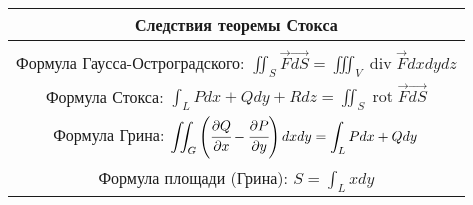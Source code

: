 \begin{tabular}{|cccc|}
	\multicolumn{4}{c}{Следствия теоремы Стокса} \\
	\hline
	& & & \\[0.1ex]

\multicolumn{4}{|c|}{Формула Гаусса-Остроградского: $\displaystyle\iint_S \vec{F}\vec{dS} = \iiint_V \operatorname{div}\vec{F}dxdydz$} \\[0.5cm]


\multicolumn{4}{|c|}{Формула Стокса: $\displaystyle \int_L Pdx + Qdy + Rdz = \iint_S \operatorname{rot}\vec{F} \vec{dS}$} \\[0.5cm]

\multicolumn{4}{|c|}{Формула Грина: $\displaystyle \iint_G \left(\cfrac{\partial Q}{\partial x} - \cfrac{\partial P}{\partial y}\right)dxdy = 
	\int_L Pdx+Qdy$} \\[0.5cm]

\multicolumn{4}{|c|}{Формула площади (Грина): $
	S = \int_L xdy
	$} \\[0.5cm]

\hline 

\end{tabular} 
